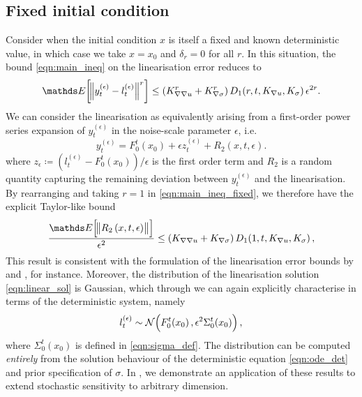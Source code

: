 \subsection{Fixed initial condition}\label{sec:theory_fixed}
Consider when the initial condition \(x\) is itself a fixed and known deterministic value, in which case we take \(x = x_0\) and \(\delta_r = 0\) for all \(r\).
In this situation, the bound \cref{eqn:main_ineq} on the linearisation error reduces to
\begin{equation}
	\avg{\norm{y_t^{(\epsilon)} - l_t^{(\epsilon)}}^r} \leq \left(K_{\nabla\nabla u}^r + K_{\nabla\sigma}^r\right)D_1\!\left(r,t, K_{\nabla u}, K_\sigma\right)\epsilon^{2r}.
	\label{eqn:main_ineq_fixed}
\end{equation}
We can consider the linearisation as equivalently arising from a first-order power series expansion of \(y_t^{(\epsilon)}\) in the noise-scale parameter \(\epsilon\), i.e.
\[
	y_t^{(\epsilon)} = F_0^t\!\left(x_0\right) + \epsilon z_t^{(\epsilon)} + R_2\left(x,t,\epsilon\right).
\]
where \(z_\epsilon \coloneqq \left(l_{t}^{(\epsilon)} - F_0^t\!\left(x_0\right)\right) / \epsilon\) is the first order term and \(R_2\) is a random quantity capturing the remaining deviation between \(y_t^{(\epsilon)}\) and the linearisation.
By rearranging and taking \(r = 1\) in \cref{eqn:main_ineq_fixed}, we therefore have the explicit Taylor-like bound
\[
	\frac{\avg{\norm{R_2\left(x,t,\epsilon\right)}}}{\epsilon^2} \leq \left(K_{\nabla \nabla u} + K_{\nabla\sigma}\right)D_1\!\left(1,t, K_{\nabla u}, K_\sigma\right),
\]
This result is consistent with the formulation of the linearisation error bounds by \citet{Blagoveshchenskii_1962_DiffusionProcessesDepending} and \citet{FreidlinWentzell_1998_RandomPerturbationsDynamical}, for instance.
Moreover, the distribution of the linearisation solution \cref{eqn:linear_sol} is Gaussian, which through  we can again explicitly characterise in terms of the deterministic system, namely
\begin{equation}
	l_t^{(\epsilon)} \sim\mathcal{N}\!\left(F_0^t\!\left(x_0\right), \epsilon^2 \Sigma_0^t\!\left(x_0\right)\right),
	\label{eqn:linear_gauss_sol}
\end{equation}
where \(\Sigma_0^t\!\left(x_0\right)\) is defined in \cref{eqn:sigma_def}.
The distribution can be computed \emph{entirely} from the solution behaviour of the deterministic equation \cref{eqn:ode_det} and prior specification of \(\sigma\).
In , we demonstrate an application of these results to extend stochastic sensitivity \cite{Balasuriya_2020_StochasticSensitivityComputable} to arbitrary dimension.


